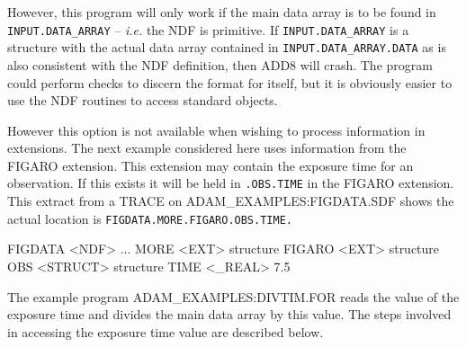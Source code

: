 \documentclass[twoside,11pt,nolof]{starlink}
\begin{document}
However, this program will only work if the main data array is
to be found in \texttt{INPUT.DATA\_ARRAY} --
\textit{i.e.} the NDF is primitive. If \texttt{INPUT.DATA\_ARRAY} is a structure
with the actual data array contained in \texttt{INPUT.DATA\_ARRAY.DATA} as is
also consistent with the NDF definition, then ADD8 will crash.
The program could  perform checks to discern the format for itself, but
it is obviously easier to use the NDF routines to access standard objects.

However this option is not available when wishing to process information in
extensions.
The next example considered here uses information from the FIGARO extension.
This  extension may contain the exposure time for an observation.
If this exists it will be held in {\tt.OBS.TIME} in the FIGARO extension.
This extract from a TRACE on ADAM\_EXAMPLES:FIGDATA.SDF shows the actual
location is \texttt{FIGDATA.MORE.FIGARO.OBS.TIME.}
\begin{terminalv}
FIGDATA  <NDF>
  ...
  MORE           <EXT>           {structure}
     FIGARO         <EXT>           {structure}
        OBS            <STRUCT>        {structure}
           TIME           <_REAL>         7.5
\end{terminalv}
The example program ADAM\_EXAMPLES:DIVTIM.FOR reads the value of the
exposure time and divides the main data array by this value.
The steps involved in accessing the exposure time value are described
below.
\end{document}
